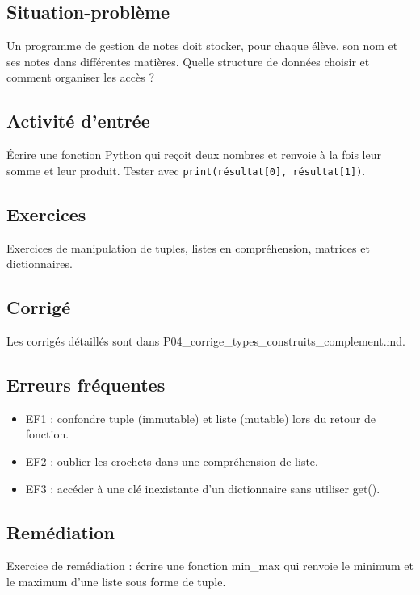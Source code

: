 \subsection{Situation-problème}

Un programme de gestion de notes doit stocker, pour chaque élève, son
nom et ses notes dans différentes matières. Quelle structure de données
choisir et comment organiser les accès ?

\subsection{Activité d’entrée}

Écrire une fonction Python qui reçoit deux nombres et renvoie à la fois
leur somme et leur produit. Tester avec \lstinline|print(résultat[0], résultat[1])|.

\subsection{Exercices}

Exercices de manipulation de tuples, listes en compréhension, matrices
et dictionnaires.

\subsection{Corrigé}

Les corrigés détaillés sont dans
P04\_corrige\_types\_construits\_complement.md.

\subsection{Erreurs fréquentes}

\begin{itemize}
\tightlist
\item
  EF1 : confondre tuple (immutable) et liste (mutable) lors du retour de
  fonction.
\item
  EF2 : oublier les crochets dans une compréhension de liste.
\item
  EF3 : accéder à une clé inexistante d'un dictionnaire sans utiliser
  get().
\end{itemize}

\subsection{Remédiation}

Exercice de remédiation : écrire une fonction min\_max qui renvoie le
minimum et le maximum d'une liste sous forme de tuple.

